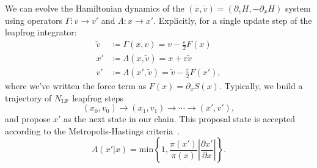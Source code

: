 \documentclass[a4paper,11pt]{article}
\begin{document}
%
We can evolve the Hamiltonian dynamics of the $(\dot{x}, \dot{v}) = (\partial_{v} H, -\partial_{x} H)$ system using operators $\Gamma: v \rightarrow v'$ and $\Lambda: x \rightarrow x'$.
%
Explicitly, for a single update step of the leapfrog integrator:
%
\begin{align}
\tilde{v} &\coloneqq \Gamma(x, v) = v - \frac{\varepsilon}{2} F(x) \\
x' &\coloneqq \Lambda(x, \tilde{v}) = x + \varepsilon \tilde{v} \\
v' &\coloneqq \Lambda(x', \tilde{v}) = \tilde{v} - \frac{\varepsilon}{2} F(x'),
\end{align}
%
where we've written the force term as $F(x) = \partial_{x}S(x)$.
%
Typically, we build a trajectory of $N_{\mathrm{LF}}$ leapfrog steps
%
\begin{equation}
(x_{0}, v_{0}) \rightarrow (x_{1}, v_{1}) \rightarrow \cdots \rightarrow (x', v'),
\end{equation}
%
and propose $x'$ as the next state in our chain.
%
This proposal state is accepted according to the Metropolis-Hastings criteria~\cite{mh}.
%
\begin{equation}
A(x'|x) = \mathrm{min}\left\{{1, \frac{\pi(x')}{\pi(x)} \left| \frac{\partial x'}{\partial x} \right|}\right\}.
\end{equation}
%
\end{document}
